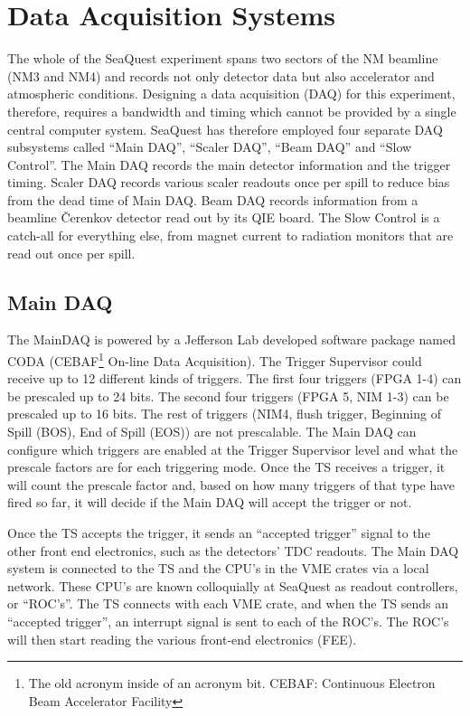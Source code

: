 \section{Data Acquisition Systems}

The whole of the SeaQuest experiment spans two sectors of the NM beamline (NM3 and NM4) and records not only detector data but also accelerator and atmospheric conditions. Designing a data acquisition (DAQ) for this experiment, therefore, requires a bandwidth and timing which cannot be provided by a single central computer system. SeaQuest has therefore employed four separate DAQ subsystems called ``Main DAQ'', ``Scaler DAQ'', ``Beam DAQ'' and ``Slow Control''. The Main DAQ records the main detector information and the trigger timing. Scaler DAQ records various scaler readouts once per spill to reduce bias from the dead time of Main DAQ. Beam DAQ records information from a beamline \v{C}erenkov detector read out by its QIE board. The Slow Control is a catch-all for everything else, from magnet current to radiation monitors that are read out once per spill.

\subsection{Main DAQ}

The MainDAQ is powered by a Jefferson Lab developed software package named CODA (CEBAF\footnote{The old acronym inside of an acronym bit. CEBAF: Continuous Electron Beam Accelerator Facility} On-line Data Acquisition). The Trigger Supervisor could receive up to 12 different kinds of triggers. The first four triggers (FPGA 1-4) can be prescaled up to 24 bits. The second four triggers (FPGA 5, NIM 1-3) can be prescaled up to 16 bits. The rest of triggers (NIM4, flush trigger, Beginning of Spill (BOS), End of Spill (EOS)) are not prescalable. The Main DAQ can configure which triggers are enabled at the Trigger Supervisor level and what the  prescale factors are for each triggering mode. Once the TS receives a trigger, it will count the prescale factor and, based on how many triggers of that type have fired so far, it will decide if the Main DAQ will accept the trigger or not. 

Once the TS accepts the trigger, it sends an ``accepted trigger'' signal to the other front end electronics, such as the detectors' TDC readouts. The Main DAQ system is connected to the TS and the CPU's in the VME crates via a local network. These CPU's are known colloquially at SeaQuest as readout controllers, or ``ROC's''. The TS connects with each VME crate, and when the TS sends an ``accepted trigger'', an interrupt signal is sent to each of the ROC's. The ROC's will then start reading the various front-end electronics (FEE).

